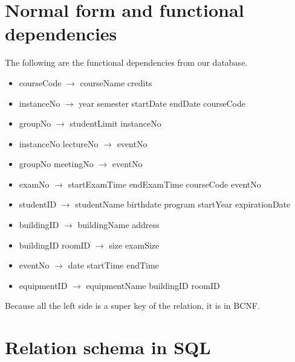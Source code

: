 \documentclass{article}
\begin{document}
\section{Normal form and functional	dependencies}

The following are the functional dependencies from our database.
\begin{itemize}
	\item courseCode $\rightarrow$ courseName credits
\item instanceNo $\rightarrow$ year semester startDate endDate courseCode
\item groupNo $\rightarrow$ studentLimit instanceNo
\item instanceNo lectureNo $\rightarrow$ eventNo
\item groupNo meetingNo $\rightarrow$ eventNo
\item examNo $\rightarrow$ startExamTime endExamTime courseCode eventNo
\item studentID $\rightarrow$ studentName birthdate program startYear expirationDate
\item buildingID $\rightarrow$ buildingName address
\item buildingID roomID $\rightarrow$ size examSize
\item eventNo $\rightarrow$ date startTime endTime
\item equipmentID $\rightarrow$ equipmentName buildingID roomID
\end{itemize}
Because all the left side is a super key of the relation, it is in BCNF.

\section{Relation schema in SQL}
\end{document}

